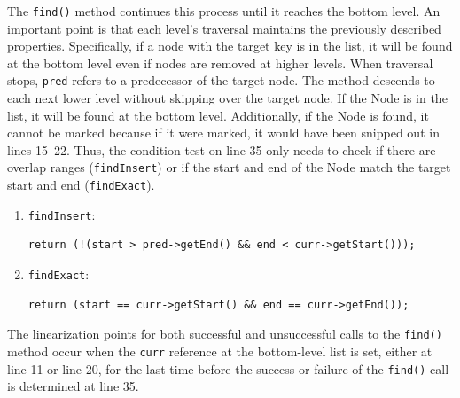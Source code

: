 The \texttt{find()} method continues this process until it reaches the bottom level.
An important point is that each level's traversal maintains the previously described properties.
Specifically, if a node with the target key is in the list, it will be found at the bottom level even if nodes are removed at higher levels.
When traversal stops, \texttt{pred} refers to a predecessor of the target node.
The method descends to each next lower level without skipping over the target node.
If the Node is in the list, it will be found at the bottom level.
Additionally, if the Node is found, it cannot be marked because if it were marked, it would have been snipped out in lines 15--22.
Thus, the condition test on line 35 only needs to check if there are overlap ranges (\texttt{findInsert}) or if the start and end of the Node match the target start and end (\texttt{findExact}).
\begin{enumerate}
    \item \texttt{findInsert}:
    \begin{lstlisting}[style=nonum, label={}]
 return (!(start > pred->getEnd() && end < curr->getStart()));
    \end{lstlisting}
    \item \texttt{findExact}:
    \begin{lstlisting}[style=nonum, label={}]
 return (start == curr->getStart() && end == curr->getEnd());
    \end{lstlisting}
\end{enumerate}

The linearization points for both successful and unsuccessful calls to the \texttt{find()} method occur when the \texttt{curr} reference at the bottom-level list is set, either at line 11 or line 20, for the last time before the success or failure of the \texttt{find()} call is determined at line 35.
